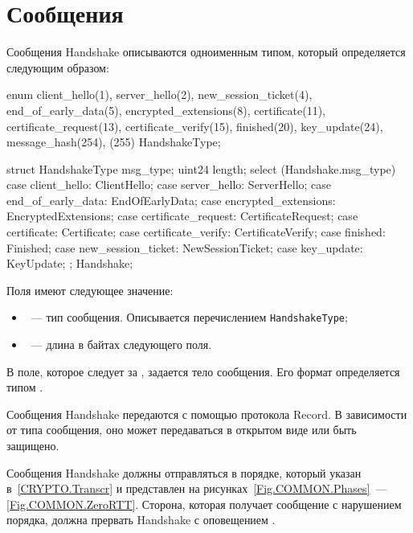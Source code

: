 \section{Сообщения}\label{HS.Msg}


Сообщения Handshake описываются одноименным типом, который определяется
следующим образом:

\begin{codeblock}
enum {
  client_hello(1),
  server_hello(2),
  new_session_ticket(4),
  end_of_early_data(5),
  encrypted_extensions(8),
  certificate(11),
  certificate_request(13),
  certificate_verify(15),
  finished(20),
  key_update(24),
  message_hash(254),
  (255)
} HandshakeType;

struct {
  HandshakeType msg_type;
  uint24 length;
  select (Handshake.msg_type) {
    case client_hello:          ClientHello;
    case server_hello:          ServerHello;
    case end_of_early_data:     EndOfEarlyData;
    case encrypted_extensions:  EncryptedExtensions;
    case certificate_request:   CertificateRequest;
    case certificate:           Certificate;
    case certificate_verify:    CertificateVerify;
    case finished:              Finished;
    case new_session_ticket:    NewSessionTicket;
    case key_update:            KeyUpdate;
  };
} Handshake;
\end{codeblock}

Поля  имеют следующее значение:
\begin{itemize}
\item
{}~--- тип сообщения. Описывается перечислением 
\lstinline{HandshakeType};

\item
{}~--- длина в байтах следующего поля.
\end{itemize}

В поле, которое следует за , задается тело сообщения.
Его формат определяется типом .

Сообщения Handshake передаются с помощью протокола Record.
В зависимости от типа сообщения, оно может передаваться в открытом виде или 
быть защищено.

Сообщения Handshake должны отправляться в порядке, который указан 
в~\ref{CRYPTO.Transcr} и представлен на рисунках~\ref{Fig.COMMON.Phases}~--- 
\ref{Fig.COMMON.ZeroRTT}.
%
Сторона, которая получает сообщение с нарушением порядка, должна прервать 
Handshake с оповещением .

